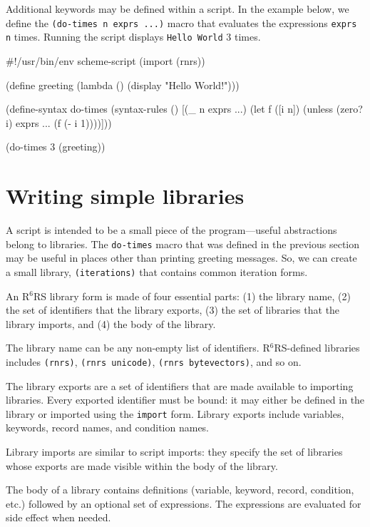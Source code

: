 \documentclass[onecolumn, 12pt, twoside, openright, dvipdfm]{book}
\newcommand{\rnrs}[1]{R$^{\mathrm{#1}}$RS}
\begin{document}
Additional keywords may be defined within a script.  In the example
below, we define the \texttt{(do-times n exprs ...)} macro that
evaluates the expressions \texttt{exprs} \texttt{n} times.  Running
the script displays \texttt{Hello World} 3 times.
\newpage

\begin{CodeInline}
#!/usr/bin/env scheme-script
(import (rnrs))

(define greeting
  (lambda ()
    (display "Hello World!\n")))

(define-syntax do-times
  (syntax-rules ()
    [(_ n exprs ...)
     (let f ([i n])
       (unless (zero? i)
         exprs ...
         (f (- i 1))))]))

(do-times 3 (greeting))
\end{CodeInline}


\section{Writing simple libraries}

A script is intended to be a small piece of the program---useful
abstractions belong to libraries.  The \texttt{do-times} macro that
was defined in the previous section may be useful in places other
than printing greeting messages.  So, we can create a small library,
\texttt{(iterations)} that contains common iteration forms.  

An \rnrs{6} library form is made of four essential parts: (1) the
library name, (2) the set of identifiers that the library exports,
(3) the set of libraries that the library imports, and (4) the body
of the library.  


The library name can be any non-empty list of identifiers.
\rnrs{6}-defined libraries includes \texttt{(rnrs)},
\texttt{(rnrs~unicode)}, \texttt{(rnrs~bytevectors)}, and so on.

The library exports are a set of identifiers that are made available
to importing libraries.  Every exported identifier must be bound: it
may either be defined in the library or imported using the
\texttt{import} form.  Library exports include variables, keywords,
record names, and condition names.

Library imports are similar to script imports: they specify the set
of libraries whose exports are made visible within the body of the
library.  

The body of a library contains definitions (variable, keyword,
record, condition, etc.) followed by an optional set of expressions.
The expressions are evaluated for side effect when needed.
\end{document}
